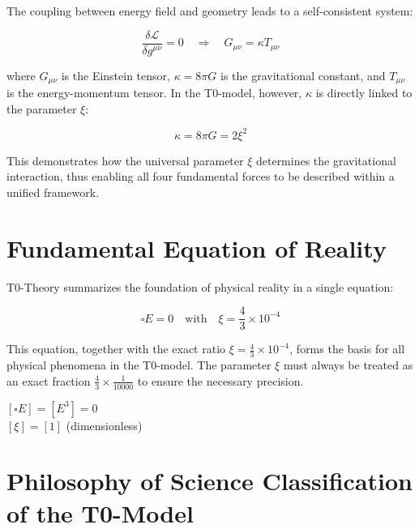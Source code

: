 \documentclass[12pt,a4paper]{article}
\theoremstyle{definition}
\begin{document}
	\begin{verhaltnis}
		The coupling between energy field and geometry leads to a self-consistent system:
		
		\begin{equation}
			\frac{\delta\mathcal{L}}{\delta g^{\mu\nu}} = 0 \quad \Rightarrow \quad G_{\mu\nu} = \kappa T_{\mu\nu}
		\end{equation}
		
		where $G_{\mu\nu}$ is the Einstein tensor, $\kappa = 8\pi G$ is the gravitational constant, and $T_{\mu\nu}$ is the energy-momentum tensor. In the T0-model, however, $\kappa$ is directly linked to the parameter $\xi$:
		
		\begin{equation}
			\kappa = 8\pi G = 2\xi^2
		\end{equation}
		
		This demonstrates how the universal parameter $\xi$ determines the gravitational interaction, thus enabling all four fundamental forces to be described within a unified framework.
	\end{verhaltnis}
	
	\section{Fundamental Equation of Reality}
	
	T0-Theory summarizes the foundation of physical reality in a single equation:
	
	\begin{equation}
		\boxed{\square E = 0 \quad \text{with} \quad \xi = \frac{4}{3} \times 10^{-4}}
	\end{equation}
	
	\begin{wichtig}
		This equation, together with the exact ratio $\xi = \frac{4}{3} \times 10^{-4}$, forms the basis for all physical phenomena in the T0-model. The parameter $\xi$ must always be treated as an exact fraction $\frac{4}{3} \times \frac{1}{10000}$ to ensure the necessary precision.
	\end{wichtig}
	
	\begin{einheitencheck}
		$[\square E] = [E^3] = 0$ \checkmark\\
		$[\xi] = [1]$ (dimensionless) \checkmark
	\end{einheitencheck}
	\section{Philosophy of Science Classification of the T0-Model}
	
\end{document}
